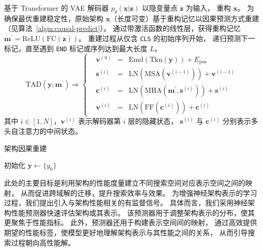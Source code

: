 \documentclass[../main.tex]{subfiles}
\begin{document}
基于 Transformer 的 VAE 解码器 $ p_{\theta}(\bm{x}|\bm{z}) $ 以隐变量点 $ \bm{z} $ 为输入，
重构 $ \bm{x} $。
为确保最优重建稳定性，原始架构 $ \bm{x} $（长度可变）基于重构记忆以因果预测方式重建（见算法~\ref{algm:causal-predict}）。
通过带激活函数的线性层，获得重构记忆 $ \bm{m}^\prime = \mathrm{ReLU}(\mathrm{FC}(\bm{z})) $。
重建过程从仅含 \texttt{CLS} 的初始序列开始，
递归预测下一标记，直至遇到 \texttt{END} 标记或序列达到最大长度 $ L $。
\begin{equation}
	\mathrm{TAD}(\bm{y};\bm{m}^\prime)\Rightarrow\left\{
	\begin{alignedat}{2}
		 & \bm{v}^{(0)} & = {} & \mathrm{Emd} (\mathrm{Tkn} (\bm{y})) + E_\mathrm{pos}                   \\
		 & \bm{s}^{(i)} & = {} & \mathrm{LN} (\mathrm{MSA} (\bm{v}^{(i-1)})) + \bm{v}^{(i-1)}            \\
		 & \bm{c}^{(i)} & = {} & \mathrm{LN} (\mathrm{MHA} (\bm{m}^\prime, \bm{s}^{(i)})) + \bm{s}^{(i)} \\
		 & \bm{v}^{(i)} & = {} & \mathrm{LN} (\mathrm{FF} (\bm{c}^{(i)})) + \bm{c}^{(i)}
	\end{alignedat}\right.
\end{equation}
其中 $ i \in [1,N] $，$ \bm{v}^{(i)} $ 表示解码器第 $ i $ 层的隐藏状态，
$ \bm{s}^{(i)} $ 与 $ \bm{c}^{(i)} $ 分别表示多头自注意力的中间状态。

\begin{algorithm}[t]
	\caption{架构因果重建}\label{algm:causal-predict}
	\SetAlgoLined{}
	\BlankLine
	初始化 $ \bm{y} \gets \{y_0\} $\;
	\BlankLine
	\BlankLine
	\;
\end{algorithm}


此处的主要目标是利用架构的性能度量建立不同搜索空间对应表示空间之间的映射，
从而促进跨域解的迁移，提升搜索效率与效果。
为增强神经架构表示的学习过程，我们提出引入与架构性能相关的有监督信号。
具体而言，我们采用神经架构性能预测器快速评估架构或其表示。
该预测器用于调整架构表示的分布，使其更聚焦于性能指标。
此外，预测器还用于构建表示空间间的映射，
通过高效提供期望的性能标签，使模型更好地理解架构表示与其性能之间的关系，
从而引导搜索过程朝向高性能解。
\end{document}
